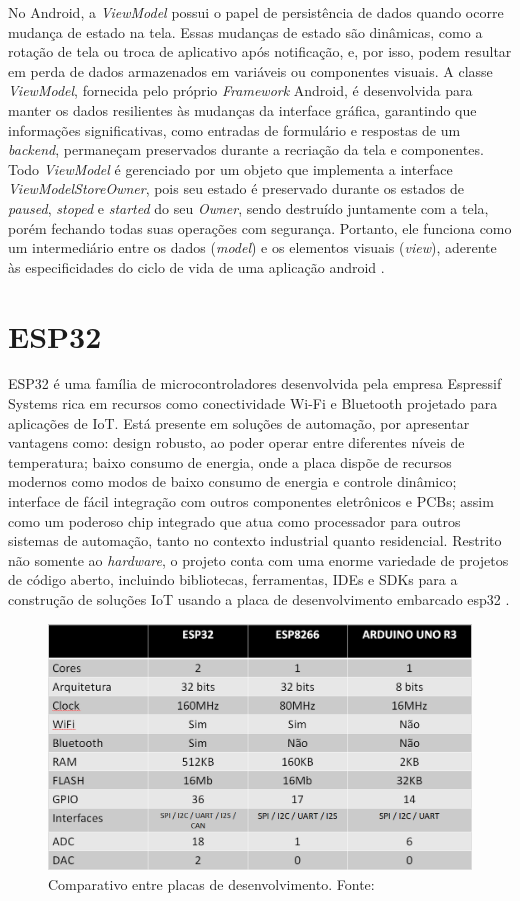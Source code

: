 No Android, a \textit{ViewModel} possui o papel de persistência de dados quando ocorre mudança 
de estado na tela. Essas mudanças de estado são dinâmicas, como a rotação de tela ou troca de aplicativo após notificação, e, por isso, 
podem resultar em perda de dados armazenados em variáveis ou componentes visuais. A classe \textit{ViewModel}, fornecida pelo próprio 
\textit{Framework} Android, é desenvolvida para manter os dados resilientes às mudanças da interface gráfica, garantindo que informações significativas, como entradas de 
formulário e respostas de um \textit{backend}, permaneçam preservados durante a recriação da tela e componentes. Todo \textit{ViewModel} é gerenciado por um objeto 
que implementa a interface \textit{ViewModelStoreOwner}, pois seu estado é preservado durante os estados de \textit{paused}, \textit{stoped} e \textit{started} do seu \textit{Owner}, sendo destruído
juntamente com a tela, porém fechando todas suas operações com segurança. Portanto, ele funciona como um intermediário entre os dados (\textit{model}) e
os elementos visuais (\textit{view}), aderente às especificidades do ciclo de vida de uma aplicação android \cite{google-developers-viewmodel}.

\section{ESP32}

ESP32 é uma família de microcontroladores desenvolvida pela empresa Espressif Systems rica em recursos como conectividade Wi-Fi e Bluetooth projetado para aplicações de IoT. 
Está presente em soluções de automação, por apresentar vantagens como: design robusto, ao poder operar entre diferentes níveis de temperatura; 
baixo consumo de energia, onde a placa dispõe de recursos modernos como modos de baixo consumo de energia e controle dinâmico; interface de fácil 
integração com outros componentes eletrônicos e PCBs; assim como um poderoso chip integrado que atua como processador para outros sistemas de automação, 
tanto no contexto industrial quanto residencial. Restrito não somente ao \textit{hardware}, o projeto conta com uma enorme variedade 
de projetos de código aberto, incluindo bibliotecas, ferramentas, IDEs e SDKs para a construção de soluções IoT usando a placa de desenvolvimento embarcado esp32 \cite{esp32-espressif-documentation}. 

\begin{figure}[ht]
    \centering
    \includegraphics[width=.57\textwidth]{img/esp32-comparation-table.png}
    \caption{Comparativo entre placas de desenvolvimento. Fonte:\cite{esp32-comparation-table}}\label{figTableEsp}
\end{figure}

